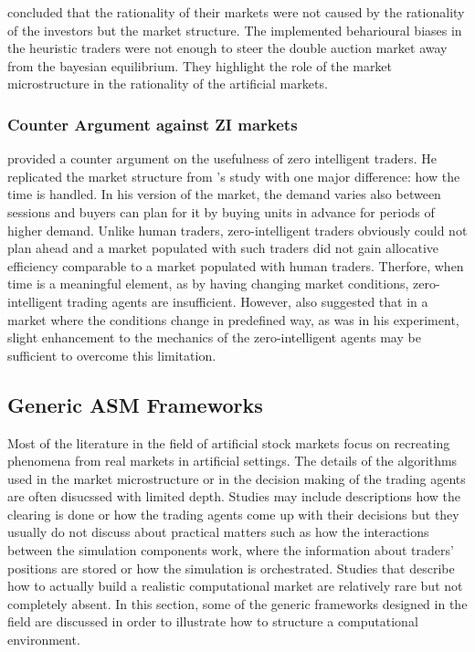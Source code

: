 \citeauthor{Jam96} concluded that the rationality of their markets were
not caused by the rationality of the investors but the market structure.
The implemented beharioural biases in the heuristic traders were not enough 
to steer the double auction market away from the bayesian equilibrium.
They highlight the role of the market microstructure in the rationality 
of the artificial markets. 


\subsubsection{Counter Argument against ZI markets}
\citet{Mil08} provided a counter argument on the usefulness of zero
intelligent traders. He replicated the market structure from
\citeauthor{God93}'s study with one major difference: how the 
time is handled. In his version of the market, the demand varies
also between sessions and buyers can plan for it by buying units
in advance for periods of higher demand. Unlike human traders,
zero-intelligent traders obviously could not plan ahead and a market
populated with such traders did not gain allocative efficiency comparable
to a market populated with human traders. Therfore, when time is a 
meaningful element, as by having changing market conditions, zero-intelligent 
trading agents are insufficient. However, \citeauthor{Mil08} also suggested
that in a market where the conditions change in predefined way, as was in 
his experiment, slight enhancement to the mechanics of the zero-intelligent 
agents may be sufficient to overcome this limitation.



\subsection{Generic ASM Frameworks}

Most of the literature in the field of artificial stock markets 
focus on recreating phenomena from real markets in artificial settings.
The details of the algorithms used in the market microstructure or in
the decision making of the trading agents are often disucssed with limited 
depth. Studies may include descriptions how the clearing is done or how the trading agents 
come up with their decisions but they usually do not discuss about practical matters 
such as how the interactions between the simulation components work, where the 
information about traders' positions are stored or how the simulation is orchestrated. 
Studies that describe how to actually build a realistic computational 
market are relatively rare but not completely absent. In this section, some of the 
generic frameworks designed in the field are discussed in order to illustrate how 
to structure a computational environment.


